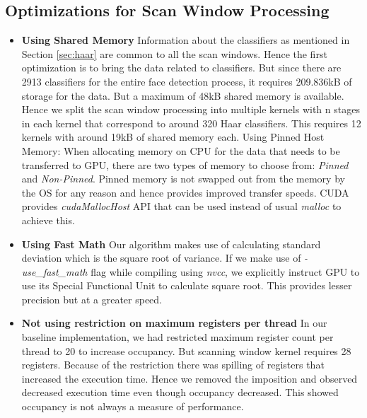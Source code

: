\subsection{Optimizations for Scan Window Processing}\label{sec:haar_optim}
\begin{itemize}

\item \textbf{Using Shared Memory}
Information about the classifiers as mentioned in Section
\ref{sec:haar} are common to all the scan windows. Hence the first optimization 
is to bring the data related to classifiers. But since there are 2913 classifiers 
for the entire face detection process, it requires 209.836kB of storage for the data. 
But a maximum of 48kB shared memory is available. Hence we split the scan window processing 
into multiple kernels with n stages in each kernel that correspond to around 320 Haar classifiers. 
This requires 12 kernels with around 19kB of shared memory each.
Using Pinned Host Memory: When allocating memory on CPU for the data that needs to be transferred 
to GPU, there are two types of memory to choose from: \emph{Pinned} and \emph{Non-Pinned}. 
Pinned memory is not swapped out from the memory by the OS for any reason and hence provides 
improved transfer speeds. CUDA provides \emph{cudaMallocHost} API that can be used instead of 
usual \emph{malloc} to achieve this.

\vspace{0.1in}
\item \textbf{Using Fast Math}
Our algorithm makes use of calculating standard deviation which is the square 
root of variance. If we make use of \emph{-use\_fast\_math} flag while compiling using \emph{nvcc}, 
we explicitly instruct GPU to use its Special Functional Unit to calculate square root. This provides 
lesser precision but at a greater speed. 

\vspace{0.1in}
\item \textbf{Not using restriction on maximum registers per thread}
In our baseline implementation, we had 
restricted maximum register count per thread to 20 to increase occupancy. But scanning window 
kernel requires 28 registers. Because of the restriction there was spilling of registers that 
increased the execution time. Hence we removed the imposition and observed decreased execution 
time even though occupancy decreased. This showed occupancy is not always a measure of performance.


\end{itemize}
